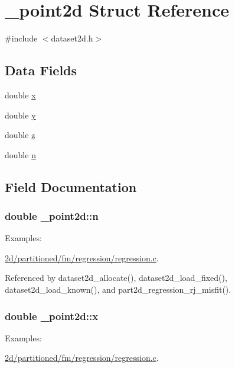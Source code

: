 \hypertarget{struct__point2d}{}\section{\+\_\+point2d Struct Reference}
\label{struct__point2d}


{\ttfamily \#include $<$dataset2d.\+h$>$}

\subsection*{Data Fields}
\begin{DoxyCompactItemize}
\item 
double \hyperlink{struct__point2d_ac951197e13faafac3b84bb641c4917b6}{x}
\item 
double \hyperlink{struct__point2d_a55d546cf232f5875cc0d27ba80b148e3}{y}
\item 
double \hyperlink{struct__point2d_aaa3dfda21bc9f5d84955e5e38dd72135}{z}
\item 
double \hyperlink{struct__point2d_aaf3858945ba5752a1895a1e7ab5ae059}{n}
\end{DoxyCompactItemize}


\subsection{Field Documentation}
\subsubsection[{\texorpdfstring{n}{n}}]{\setlength{\rightskip}{0pt plus 5cm}double \+\_\+point2d\+::n}\hypertarget{struct__point2d_aaf3858945ba5752a1895a1e7ab5ae059}{}\label{struct__point2d_aaf3858945ba5752a1895a1e7ab5ae059}
\begin{Desc}
\item[Examples\+: ]\par
\hyperlink{2d_2partitioned_2fm_2regression_2regression_8c-example}{2d/partitioned/fm/regression/regression.\+c}.\end{Desc}


Referenced by dataset2d\+\_\+allocate(), dataset2d\+\_\+load\+\_\+fixed(), dataset2d\+\_\+load\+\_\+known(), and part2d\+\_\+regression\+\_\+rj\+\_\+misfit().

\subsubsection[{\texorpdfstring{x}{x}}]{\setlength{\rightskip}{0pt plus 5cm}double \+\_\+point2d\+::x}\hypertarget{struct__point2d_ac951197e13faafac3b84bb641c4917b6}{}\label{struct__point2d_ac951197e13faafac3b84bb641c4917b6}
\begin{Desc}
\item[Examples\+: ]\par
\hyperlink{2d_2partitioned_2fm_2regression_2regression_8c-example}{2d/partitioned/fm/regression/regression.\+c}.\end{Desc}


